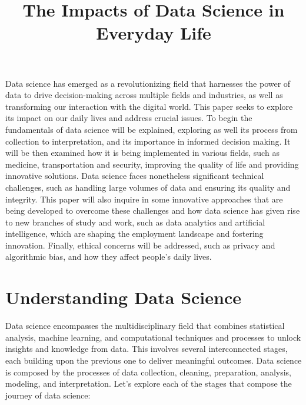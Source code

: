 \documentclass{vgtc}                          %
\title{The Impacts of Data Science in Everyday Life}
\begin{document}


\maketitle

Data science has emerged as a revolutionizing field that harnesses the power of data to drive decision-making across multiple fields and industries, as 
well as transforming our interaction with the digital world. This paper seeks to explore its impact on our daily lives and address crucial issues. To begin 
the fundamentals of data science will be explained, exploring as well its process from collection to interpretation, and its importance in informed decision 
making. It will be then examined how it is being implemented in various fields, such as medicine, transportation and security, improving the quality of life 
and providing innovative solutions. Data science faces nonetheless significant technical challenges, such as handling large volumes of data and ensuring its 
quality and integrity. This paper will also inquire in some innovative approaches that are being developed to overcome these challenges and how data science 
has given rise to new branches of study and work, such as data analytics and artificial intelligence, which are shaping the employment landscape and fostering 
innovation. Finally, ethical concerns will be addressed, such as privacy and algorithmic bias, and how they affect people's daily lives.

\section{Understanding Data Science}

Data science encompasses the multidisciplinary field that combines statistical analysis, machine learning, and computational techniques and processes 
to unlock insights and knowledge from data. This involves several interconnected stages, each building upon the previous one to deliver meaningful outcomes. 
Data science is composed by the processes of data collection, cleaning, preparation, analysis, modeling, and interpretation. Let's explore each of the 
stages that compose the journey of data science:
\end{document}
